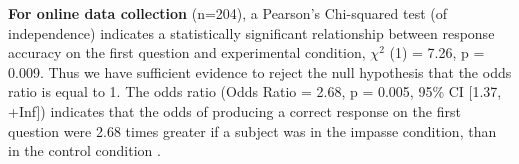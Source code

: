 \documentclass[
  letterpaper,
  DIV=11,
  numbers=noendperiod]{scrreprt}
\newenvironment{Shaded}{\begin{snugshade}}{\end{snugshade}}
\newcommand{\AttributeTok}[1]{\textcolor[rgb]{0.40,0.45,0.13}{#1}}
\newcommand{\ConstantTok}[1]{\textcolor[rgb]{0.56,0.35,0.01}{#1}}
\newcommand{\DecValTok}[1]{\textcolor[rgb]{0.68,0.00,0.00}{#1}}
\newcommand{\FunctionTok}[1]{\textcolor[rgb]{0.28,0.35,0.67}{#1}}
\newcommand{\NormalTok}[1]{\textcolor[rgb]{0.00,0.23,0.31}{#1}}
\newcommand{\OtherTok}[1]{\textcolor[rgb]{0.00,0.23,0.31}{#1}}
\newcommand{\SpecialCharTok}[1]{\textcolor[rgb]{0.37,0.37,0.37}{#1}}
\begin{document}
\textbf{For online data collection} (n=204), a Pearson's Chi-squared
test (of independence) indicates a statistically significant
relationship between response accuracy on the first question and
experimental condition, \(\chi^2\) (1) = 7.26, p = 0.009. Thus we have
sufficient evidence to reject the null hypothesis that the odds ratio is
equal to 1. The odds ratio (Odds Ratio = 2.68, p = 0.005, 95\% CI
{[}1.37, +Inf{]}) indicates that the odds of producing a correct
response on the first question were 2.68 times greater if a subject was
in the impasse condition, than in the control condition .

\begin{Shaded}
\end{Shaded}
\end{document}

